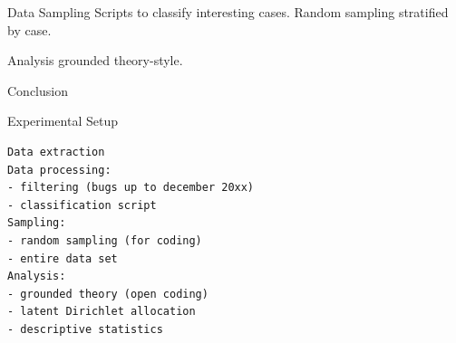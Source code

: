\begin{section}{Data Sampling}
	Scripts to classify interesting cases.
	Random sampling stratified by case.
	
\end{section}

\begin{section}{Analysis}
	grounded theory-style.
	
\end{section}

\begin{section}{Conclusion}
	
\end{section}

\begin{section}{Experimental Setup}

\begin{verbatim}
Data extraction
Data processing: 
- filtering (bugs up to december 20xx)
- classification script
Sampling:
- random sampling (for coding)
- entire data set
Analysis:
- grounded theory (open coding)
- latent Dirichlet allocation
- descriptive statistics
\end{verbatim}

\end{section}

